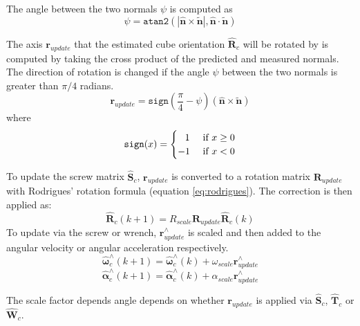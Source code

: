 			The angle between the two normals $\psi$ is computed as
			\begin{equation}
				\psi = \texttt{atan2}(|\hat{\mathbf{n}}\times\tilde{\mathbf{n}}|,\hat{\mathbf{n}}\cdot\tilde{\mathbf{n}})
			\end{equation}
			
			The axis $\mathbf{r}_{update}$ that the estimated cube orientation $\hat{\mathbf{R}}_c$ will be rotated by is computed by taking the cross product of the predicted and measured normals. The direction of rotation is changed if the angle $\psi$ between the two normals is greater than $\pi/4$ radians.
			\begin{equation}
				\mathbf{r}_{update} = \texttt{sign}\left(\frac{\pi}{4}-\psi \right)(\hat{\mathbf{n}} \times \tilde{\mathbf{n}}) 
			\end{equation}
			where
			\begin{equation}
			\texttt{sign}(x) = 
				\begin{cases} 
				      \hspace{0.75em} 1    \hfill & \text{ if $x \geq 0$} \\
				      \hfill -1 \hfill & \text{ if $x < 0$} \\
				\end{cases} 
			\end{equation}
		
			To update the screw matrix $\hat{\mathbf{S}}_c$, $\mathbf{r}_{update}$ is converted to a rotation matrix $\mathbf{R}_{update}$ with Rodrigues' rotation formula (equation \ref{eq:rodrigues}). The correction is then applied as:
			\begin{equation}
				\hat{\mathbf{R}}_{c}(k+1) = R_{scale}\mathbf{R}_{update}\hat{\mathbf{R}}_{c}(k)
			\end{equation}
			To update via the screw or wrench, $\mathbf{r}_{update}^{\wedge}$ is scaled and then added to the angular velocity or angular acceleration respectively.
			\begin{equation}
				\hat{\bm{\omega}}_{c}^{\wedge}(k+1) = \hat{\bm{\omega}}_{c}^{\wedge}(k) + \omega_{scale}\mathbf{r}_{update}^{\wedge}
			\end{equation}
			\begin{equation}
				\hat{\bm{\alpha}}_{c}^{\wedge}(k+1) = \hat{\bm{\alpha}}_{c}^{\wedge}(k) + 	\alpha_{scale}\mathbf{r}_{update}^{\wedge}
			\end{equation}
			
			The scale factor depends angle depends on whether $\mathbf{r}_{update}$ is applied via $\hat{\mathbf{S}}_c$, $\hat{\mathbf{T}}_c$ or $\hat{\mathbf{W}}_c$.
				
